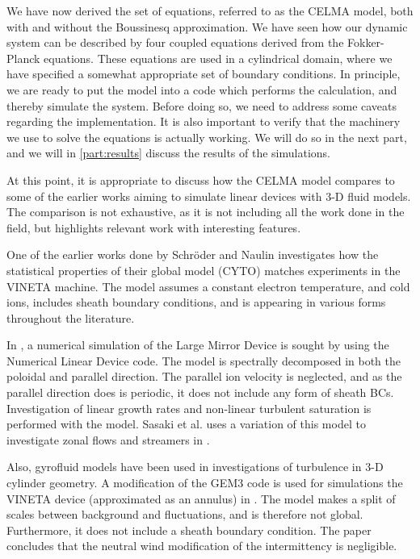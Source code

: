 We have now derived the set of equations, referred to as the CELMA model, both with and without the Boussinesq approximation.
We have seen how our dynamic system can be described by four coupled equations derived from the Fokker-Planck equations.
These equations are used in a cylindrical domain, where we have specified a somewhat appropriate set of boundary conditions.
In principle, we are ready to put the model into a code which performs the calculation, and thereby simulate the system.
Before doing so, we need to address some caveats regarding the implementation.
It is also important to verify that the machinery we use to solve the equations is actually working.
We will do so in the next part, and we will in \cref{part:results} discuss the results of the simulations.

At this point, it is appropriate to discuss how the CELMA model compares to some of the earlier works aiming to simulate linear devices with $3$-D fluid models.
The comparison is not exhaustive, as it is not including all the work done in the field, but highlights relevant work with interesting features.

One of the earlier works done by Schr{\"o}der and Naulin \cite{Schroder2003Phd} investigates how the statistical properties of their global model (CYTO) matches experiments in the VINETA machine.
The model assumes a constant electron temperature, and cold ions, includes sheath boundary conditions, and is appearing in various forms throughout the literature.

In \cite{Kasuya2006}, a numerical simulation of the Large Mirror Device is sought by using the Numerical Linear Device code.
The model is spectrally decomposed in both the poloidal and parallel direction.
The parallel ion velocity is neglected, and as the parallel direction does is periodic, it does not include any form of sheath BCs.
Investigation of linear growth rates and non-linear turbulent saturation is performed with the model.
Sasaki et al. uses a variation of this model to investigate zonal flows and streamers in \cite{Sasaki2014}.

Also, gyrofluid models have been used in investigations of turbulence in $3$-D cylinder geometry.
A modification of the GEM3 code is used for simulations the VINETA device (approximated as an annulus) in \cite{Kervalishvili2008}.
The model makes a split of scales between background and fluctuations, and is therefore not global.
Furthermore, it does not include a sheath boundary condition.
The paper concludes that the neutral wind modification of the intermittency is negligible.

